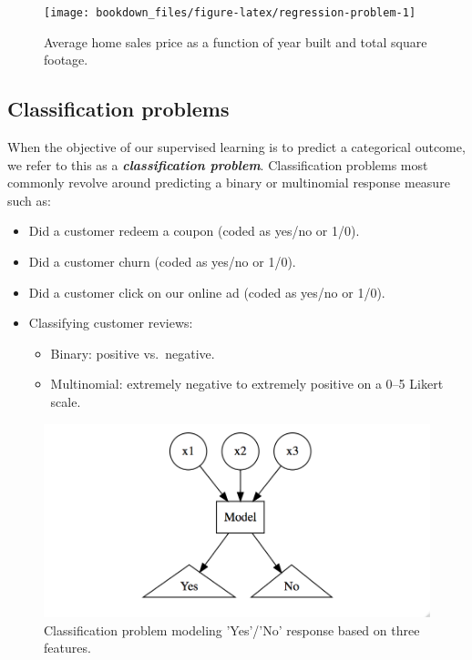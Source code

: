 \documentclass[]{krantz}
\providecommand{\tightlist}{%
  \setlength{\itemsep}{0pt}\setlength{\parskip}{0pt}}
\begin{document}
\begin{figure}

{\centering \texttt{[image: bookdown\_files/figure-latex/regression-problem-1]} 

}

\caption{Average home sales price as a function of year built and total square footage.}\label{fig:regression-problem}
\end{figure}

\hypertarget{classification-problems}{%
\subsection{Classification problems}\label{classification-problems}}

When the objective of our supervised learning is to predict a categorical outcome, we refer to this as a \textbf{\emph{classification problem}}. Classification problems most commonly revolve around predicting a binary or multinomial response measure such as:

\begin{itemize}
\tightlist
\item
  Did a customer redeem a coupon (coded as yes/no or 1/0).
\item
  Did a customer churn (coded as yes/no or 1/0).
\item
  Did a customer click on our online ad (coded as yes/no or 1/0).
\item
  Classifying customer reviews:

  \begin{itemize}
  \tightlist
  \item
    Binary: positive vs.~negative.
  \item
    Multinomial: extremely negative to extremely positive on a 0--5 Likert scale.
  \end{itemize}
\end{itemize}

\begin{figure}

{\centering \includegraphics[width=0.75\linewidth,height=0.75\textheight]{images/classification_problem} 

}

\caption{Classification problem modeling 'Yes'/'No' response based on three features.}\label{fig:classification-problem}
\end{figure}
\end{document}
